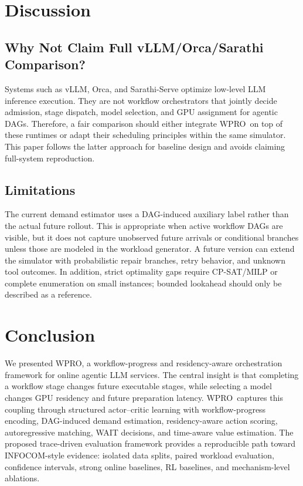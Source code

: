 \documentclass[10pt,conference]{IEEEtran}
\newcommand{\WPRO}{\textsc{WPRO}}
\begin{document}
\section{Discussion}

\subsection{Why Not Claim Full vLLM/Orca/Sarathi Comparison?}

Systems such as vLLM, Orca, and Sarathi-Serve optimize low-level LLM inference execution. They are not workflow orchestrators that jointly decide admission, stage dispatch, model selection, and GPU assignment for agentic DAGs. Therefore, a fair comparison should either integrate \WPRO\ on top of these runtimes or adapt their scheduling principles within the same simulator. This paper follows the latter approach for baseline design and avoids claiming full-system reproduction.

\subsection{Limitations}

The current demand estimator uses a DAG-induced auxiliary label rather than the actual future rollout. This is appropriate when active workflow DAGs are visible, but it does not capture unobserved future arrivals or conditional branches unless those are modeled in the workload generator. A future version can extend the simulator with probabilistic repair branches, retry behavior, and unknown tool outcomes. In addition, strict optimality gaps require CP-SAT/MILP or complete enumeration on small instances; bounded lookahead should only be described as a reference.

\section{Conclusion}

We presented \WPRO, a workflow-progress and residency-aware orchestration framework for online agentic LLM services. The central insight is that completing a workflow stage changes future executable stages, while selecting a model changes GPU residency and future preparation latency. \WPRO\ captures this coupling through structured actor--critic learning with workflow-progress encoding, DAG-induced demand estimation, residency-aware action scoring, autoregressive matching, WAIT decisions, and time-aware value estimation. The proposed trace-driven evaluation framework provides a reproducible path toward INFOCOM-style evidence: isolated data splits, paired workload evaluation, confidence intervals, strong online baselines, RL baselines, and mechanism-level ablations.



\end{document}
